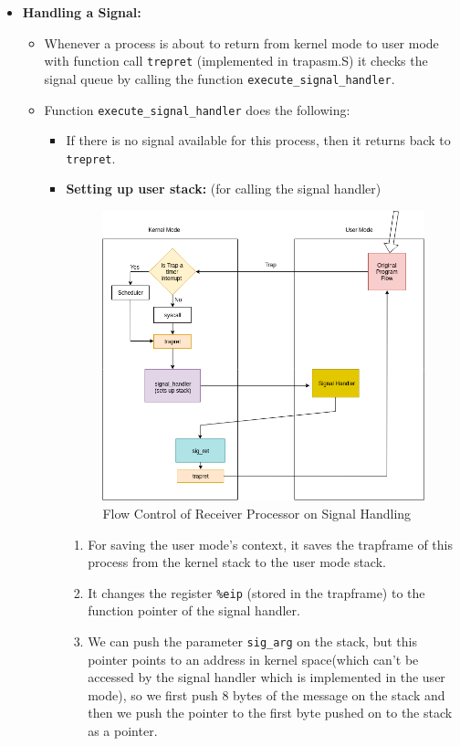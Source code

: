 \documentclass[a4 paper]{article}
\newcommand{\code}[1]{\texttt{#1}}
\begin{document}
\begin{itemize}
\item \textbf{Handling a Signal:}
\begin{itemize}
  \item Whenever a process is about to return from kernel mode to user mode with function call \code{trepret} (implemented in trapasm.S) it checks the signal queue by calling the function \code{execute\_signal\_handler}.
  \item Function \code{execute\_signal\_handler} does the following:
  \begin{itemize}
    \item If there is no signal available for this process, then it returns back to \code{trepret}.
    \item \textbf{Setting up user stack:} (for calling the signal handler)
    \begin{figure}[ht!]
      \centering %
      \includegraphics[width=110mm]{./Diagrams/flow_control.png}
      \caption{Flow Control of Receiver Processor on Signal Handling\label{MIMD}}
    \end{figure}
    \begin{enumerate}
      \item For saving the user mode's context, it saves the trapframe of this process from the kernel stack to the user mode stack.
      \item It changes the register \code{\%eip} (stored in the trapframe) to the function pointer of the signal handler.
      \item We can push the parameter \code{sig\_arg} on the stack, but this pointer points to an address in kernel space(which can't be accessed by the signal handler which is implemented in the user mode), so we first push 8 bytes of the message on the stack and then we push the pointer to the first byte pushed on to the stack as a pointer.

\end{enumerate}
\end{itemize}
\end{itemize}
\end{itemize}
\end{document}
